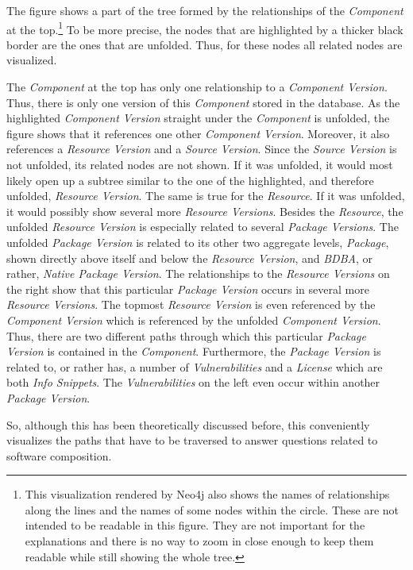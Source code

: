The figure shows a part of the tree formed by the relationships of the \emph{Component} at the top.\footnote{This visualization rendered by Neo4j also shows the names of relationships along the lines and the names of some nodes within the circle. These are not intended to be readable in this figure. They are not important for the explanations and there is no way to zoom in close enough to keep them readable while still showing the whole tree.} To be more precise, the nodes that are highlighted by a thicker black border are the ones that are unfolded. Thus, for these nodes all related nodes are visualized.\par
The \emph{Component} at the top has only one relationship to a \emph{Component Version}. Thus, there is only one version of this \emph{Component} stored in the database. As the highlighted \emph{Component Version} straight under the \emph{Component} is unfolded, the figure shows that it references one other \emph{Component Version}. Moreover, it also references a \emph{Resource Version} and a \emph{Source Version}. Since the \emph{Source Version} is not unfolded, its related nodes are not shown. If it was unfolded, it would most likely open up a subtree similar to the one of the highlighted, and therefore unfolded, \emph{Resource Version}. The same is true for the \emph{Resource}. If it was unfolded, it would possibly show several more \emph{Resource Versions}. Besides the \emph{Resource}, the unfolded \emph{Resource Version} is especially related to several \emph{Package Versions}. The unfolded \emph{Package Version} is related to its other two aggregate levels, \emph{Package}, shown directly above itself and below the \emph{Resource Version}, and \emph{BDBA}, %
or rather, \emph{Native Package Version}. The relationships to the \emph{Resource Versions} on the right show that this particular \emph{Package Version} occurs in several more \emph{Resource Versions}. The topmost \emph{Resource Version} is even referenced by the \emph{Component Version} which is referenced by the unfolded \emph{Component Version}. Thus, there are two different paths through which this particular \emph{Package Version} is contained in the \emph{Component}. Furthermore, the \emph{Package Version} is related to, or rather has, a number of \emph{Vulnerabilities} and a \emph{License} which are both \emph{Info Snippets}. The \emph{Vulnerabilities} on the left even occur within another \emph{Package Version}.\par 
So, although this has been theoretically discussed before, this conveniently visualizes the paths that have to be traversed to answer questions related to software composition.


